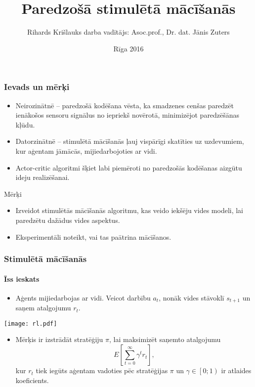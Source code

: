 \documentclass[xetex,mathserif]{beamer}
\title{Paredzošā stimulētā mācīšanās}
\author{Rihards Krišlauks \newline \small{darba vadītājs: Asoc.prof., Dr. dat. Jānis Zuters}}
\date{Rīga 2016}
\begin{document}
  \frame{\titlepage}
  \begin{frame}
    \frametitle{Ievads un mērķi}
    \begin{itemize} 
    \item Neirozinātnē -- paredzošā kodēšana vēsta, ka smadzenes cenšas
      paredzēt ienākošos sensoru signālus no iepriekš novērotā, minimizējot
      paredzēšānas kļūdu.
    \item Datorzinātnē -- stimulētā mācīšanās ļauj vispārīgi skatīties uz
      uzdevumiem, kur aģentam jāmācās, mijiedarbojoties ar vidi. 
    \item Actor-critic algoritmi šķiet labi piemēroti no paredzošās kodēšanas
      aizgūtu ideju realizēšanai.
    \end{itemize}
    \vspace{0.5cm}
    Mērķi
    \begin{itemize} 
    \item Izveidot stimulētās mācīšanās algoritmu, kas veido iekšēju vides
      modeli, lai paredzētu dažādus vides aspektus.
    \item Eksperimentāli noteikt, vai tas paātrina mācīšanos.
    \end{itemize}
  \end{frame}


  \begin{frame}
    \frametitle{Stimulētā mācīšanās}
    \framesubtitle{Īss ieskats}
    \begin{itemize}
      \item Aģents mijiedarbojas ar vidi. Veicot darbību $a_t$, nonāk vides
        stāvoklī $s_{t+1}$ un saņem atalgojumu $r_{t}$.
    \end{itemize}
    \begin{center}
      \texttt{[image: rl.pdf]}
    \end{center}
    \begin{itemize}
      \item Mērķis ir izstrādāt stratēģiju $\pi$, lai maksimizēt saņemto atalgojumu
        \[
          E\left[\sum_{t=0}^{\infty}\gamma^t r_t\right],
        \]
        kur $r_t$ tiek iegūts aģentam vadoties pēc stratēģijas $\pi$ un $\gamma \in
    \left[0; 1\right)$ ir atlaides koeficients.
    \end{itemize}
    
  \end{frame}
  
\end{document}
